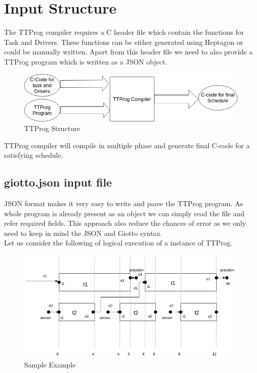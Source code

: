 \documentclass[16pt]{report}
\begin{document}
\section{Input Structure}
The TTProg compiler requires a C header file which contain the functions for Task and Drivers. These functions can be either generated using Heptagon or could be manually written. Apart from this header file we need to also provide a TTProg program which is written as a JSON object. 


\begin{figure}[H]
\centering
\includegraphics[width=0.9\linewidth]{9GiottoStructure.png}
\caption{TTProg Structure}
\end{figure}


TTProg compiler will compile in multiple phase and generate final C-code for a satisfying schedule.

\subsection{giotto.json input file}
JSON format makes it very easy to write and parse the TTProg program. As whole program is already present as an object we can simply read the file and refer required fields. This approach also reduce the chances of error as we only need to keep in mind the JSON and Giotto syntax.\\
Let us consider the following of logical execution of a instance of TTProg.

\begin{figure}[H]
\centering
\includegraphics[width=0.9\linewidth]{10Example.png}
\caption{Sample Example}
\end{figure}
\end{document}
